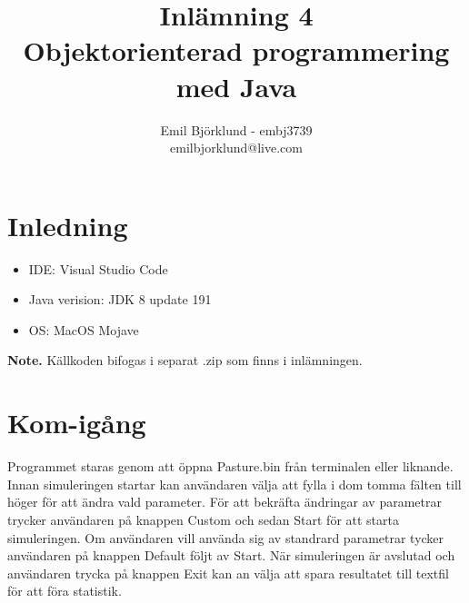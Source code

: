 \documentclass{article}
\title{Inlämning 4 \\ Objektorienterad programmering med Java}
\author{Emil Björklund - embj3739 \\ emilbjorklund@live.com}
\begin{document}
\maketitle 
\newpage

\section{Inledning}
\begin {itemize}
\item IDE: Visual Studio Code
\item Java verision: JDK 8 update 191
\item OS: MacOS Mojave
\end{itemize}

\textbf{Note.} Källkoden bifogas i separat .zip som finns i inlämningen.

\section{Kom-igång}
Programmet staras genom att öppna Pasture.bin från terminalen eller liknande.
Innan simuleringen startar kan användaren välja att fylla i dom tomma fälten till höger för att ändra vald parameter.
För att bekräfta ändringar av parametrar trycker användaren på knappen Custom och sedan Start för att starta simuleringen.
Om användaren vill använda sig av standrard parametrar tycker användaren på knappen Default följt av Start.
När simuleringen är avslutad och användaren trycka på knappen Exit kan an välja att spara resultatet till textfil för att föra statistik.
\end{document}
